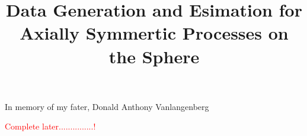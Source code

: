 \documentclass[phd]{uncgdissertation}
\title{Data Generation and Esimation for Axially Symmertic Processes on the Sphere }
\begin{document}
\frontmatter      %



\maketitlepage  

\makecopyrightpage


\begin{dedication}
In memory of my fater, Donald Anthony Vanlangenberg
\end{dedication}

\makeapprovalpage

\begin{acknowledgements}
\textcolor{red}{Complete later...............!}
\end{acknowledgements}

\end{document}
